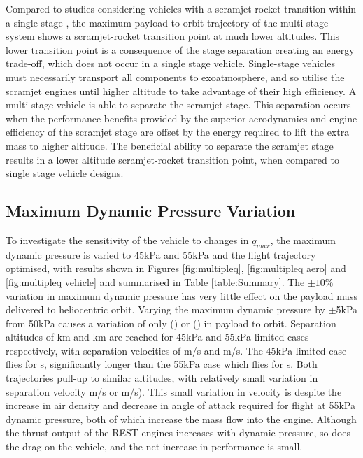 Compared to studies considering vehicles with a scramjet-rocket transition within a single stage \cite{Lu1993}\cite{Trefny1999}, the maximum payload to orbit trajectory of the multi-stage system shows a scramjet-rocket transition point at much lower altitudes.
This lower transition point is a consequence of the stage separation creating an energy trade-off, which does not occur in a single stage vehicle. Single-stage vehicles must necessarily transport all components to exoatmosphere, and so utilise the scramjet engines until higher altitude to take advantage of their high efficiency. A multi-stage vehicle is able to separate the scramjet stage. 
This separation occurs when the performance benefits provided by the superior aerodynamics and engine efficiency of the scramjet stage are offset by the energy required to lift the extra mass to higher altitude. The beneficial ability
to separate the scramjet stage results in a lower altitude scramjet-rocket transition point, when compared to single
stage vehicle designs.



\subsection{Maximum Dynamic Pressure Variation}

To investigate the sensitivity of the vehicle to changes in $q_{max}$, the maximum dynamic pressure is varied to 45kPa and 55kPa and the flight trajectory optimised, with results shown in Figures \ref{fig:multipleq}, \ref{fig:multipleq aero} and \ref{fig:multipleq vehicle} and summarised in Table \ref{table:Summary}.
The $\pm10\%$ variation in maximum dynamic pressure has very little effect on the payload mass delivered to heliocentric orbit.  Varying the maximum dynamic pressure by $\pm$5kPa from 50kPa causes a variation of only  \qVariationPluskg (\qVariationPlus) or \qVariationMinuskg (\qVariationMinus) in payload to orbit.  
Separation altitudes of \SeparationAltFortyFivekPa km and \SeparationAltFiftyFivekPa km are reached  for 45kPa and 55kPa limited cases respectively, with separation velocities of \SeparationvFortyFivekPa m/s and \SeparationvFiftyFivekPa m/s. The 45kPa limited case flies for \FlightTimeFortyFivekPa s, significantly longer than the 55kPa case which flies for \FlightTimeFiftyFivekPa s.
Both trajectories pull-up to similar altitudes, with relatively small variation in separation velocity \vVariationMinus m/s or \vVariationPlus m/s).
This small variation in velocity is despite the increase in air density and decrease in angle of attack required for flight at 55kPa dynamic pressure, both of which increase the mass flow into the engine. Although the thrust output of the REST engines increases with dynamic pressure, so does the drag on the vehicle, and the net increase in performance is small. 


